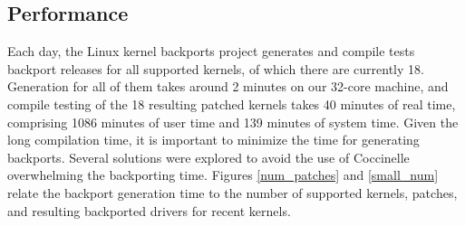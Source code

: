 

\subsection{Performance}

Each day, the Linux kernel backports project generates and compile tests
backport releases for all supported kernels, of which there are currently
18.  Generation for all of them takes around 2 minutes on our 32-core
machine, and compile testing of the 18 resulting patched kernels takes 40
minutes of real time, comprising 1086 minutes of user time and 139 minutes
of system time.  Given the long compilation time, it is important to
minimize the time for generating backports.  Several solutions were
explored to avoid the use of Coccinelle overwhelming the backporting time.
Figures \ref{num_patches} and \ref{small_num} relate the backport
generation time to the number of supported kernels, patches, and resulting
backported drivers for recent kernels.







